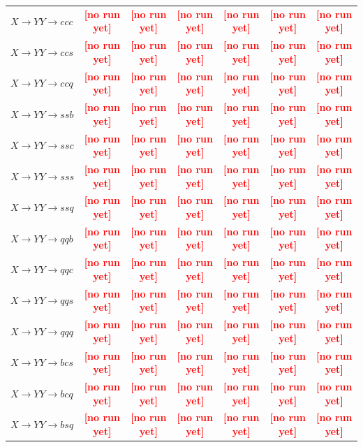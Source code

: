 \documentclass[12pt]{article}   %
\newcommand{\pending}[1]{\textcolor{red}{\textbf{[#1]}}}
\begin{document}
\begin{landscape}
{\begin{longtable}{@{\extracolsep{\fill}}lcccccc@{}}
$X\to YY\to ccc$ & \pending{no run yet} & \pending{no run yet} & \pending{no run yet} & \pending{no run yet} & \pending{no run yet} & \pending{no run yet} \\
$X\to YY\to ccs$ & \pending{no run yet} & \pending{no run yet} & \pending{no run yet} & \pending{no run yet} & \pending{no run yet} & \pending{no run yet} \\
$X\to YY\to ccq$ & \pending{no run yet} & \pending{no run yet} & \pending{no run yet} & \pending{no run yet} & \pending{no run yet} & \pending{no run yet} \\
$X\to YY\to ssb$ & \pending{no run yet} & \pending{no run yet} & \pending{no run yet} & \pending{no run yet} & \pending{no run yet} & \pending{no run yet} \\
$X\to YY\to ssc$ & \pending{no run yet} & \pending{no run yet} & \pending{no run yet} & \pending{no run yet} & \pending{no run yet} & \pending{no run yet} \\
$X\to YY\to sss$ & \pending{no run yet} & \pending{no run yet} & \pending{no run yet} & \pending{no run yet} & \pending{no run yet} & \pending{no run yet} \\
$X\to YY\to ssq$ & \pending{no run yet} & \pending{no run yet} & \pending{no run yet} & \pending{no run yet} & \pending{no run yet} & \pending{no run yet} \\
$X\to YY\to qqb$ & \pending{no run yet} & \pending{no run yet} & \pending{no run yet} & \pending{no run yet} & \pending{no run yet} & \pending{no run yet} \\
$X\to YY\to qqc$ & \pending{no run yet} & \pending{no run yet} & \pending{no run yet} & \pending{no run yet} & \pending{no run yet} & \pending{no run yet} \\
$X\to YY\to qqs$ & \pending{no run yet} & \pending{no run yet} & \pending{no run yet} & \pending{no run yet} & \pending{no run yet} & \pending{no run yet} \\
$X\to YY\to qqq$ & \pending{no run yet} & \pending{no run yet} & \pending{no run yet} & \pending{no run yet} & \pending{no run yet} & \pending{no run yet} \\
$X\to YY\to bcs$ & \pending{no run yet} & \pending{no run yet} & \pending{no run yet} & \pending{no run yet} & \pending{no run yet} & \pending{no run yet} \\
$X\to YY\to bcq$ & \pending{no run yet} & \pending{no run yet} & \pending{no run yet} & \pending{no run yet} & \pending{no run yet} & \pending{no run yet} \\
$X\to YY\to bsq$ & \pending{no run yet} & \pending{no run yet} & \pending{no run yet} & \pending{no run yet} & \pending{no run yet} & \pending{no run yet} \\

\end{longtable}}
\end{landscape}
\end{document}
